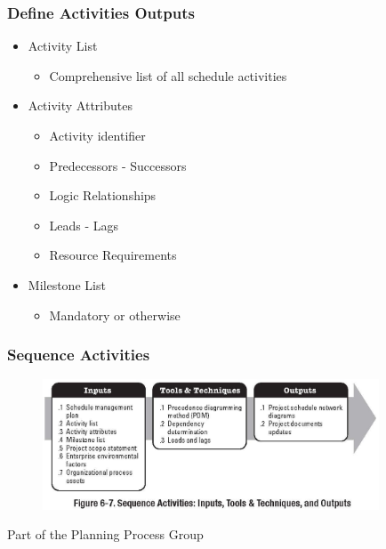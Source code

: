 \begin{frame}
\frametitle{Define Activities \hfill Outputs}
\begin{itemize}
	\item Activity List
		\begin{itemize}
			\item Comprehensive list of all schedule activities
		\end{itemize}
	\item Activity Attributes
		\begin{itemize}
			\item Activity identifier
			\item Predecessors - Successors
			\item Logic Relationships
			\item Leads - Lags
			\item Resource Requirements
		\end{itemize}
	\item Milestone List
		\begin{itemize}
			\item Mandatory or otherwise
		\end{itemize}
\end{itemize}
\end{frame}




\begin{frame}
\frametitle{Sequence Activities}
\begin{figure}
	\centering
		\includegraphics[width = 10cm]{images/Fig6-7.jpg}
	\label{fig:6-7}
\end{figure}
Part of the Planning Process Group
\end{frame}




